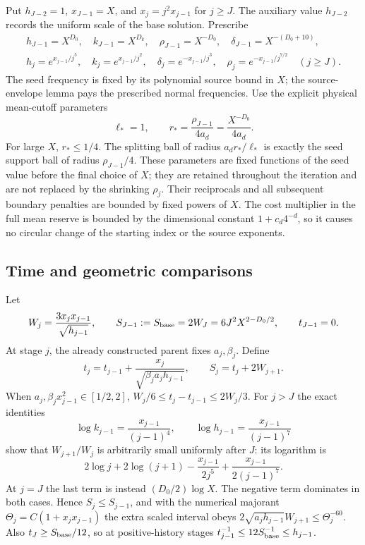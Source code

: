 Put $h_{J-2}=1$, $x_{J-1}=X$, and $x_j=j^2x_{j-1}$ for $j\geq J$.
The auxiliary value $h_{J-2}$ records the uniform scale of the base
solution. Prescribe
\begin{align}
 h_{J-1}=X^{D_0},\quad k_{J-1}=X^{D_k},\quad
 \rho_{J-1}=X^{-D_0},\quad \delta_{J-1}=X^{-(D_0+10)},
 \label{eq:seed-scales}\\
 h_j=e^{x_{j-1}/j^5},\quad k_j=e^{x_{j-1}/j^2},\quad
 \delta_j=e^{-x_{j-1}/j^3},\quad
 \rho_j=e^{-x_{j-1}/j^{7/2}}\quad(j\geq J).
 \label{eq:normal-scales}
\end{align}
The seed frequency is fixed by its polynomial source bound in $X$;
the source-envelope lemma pays the prescribed normal frequencies.
Use the explicit physical mean-cutoff parameters
\[
 \ell_*=1,\qquad r_*=\frac{\rho_{J-1}}{4a_d}
                   =\frac{X^{-D_0}}{4a_d}.
\]
For large $X$, $r_*\le1/4$. The splitting ball of radius
$a_dr_*/\ell_*$ is exactly the seed support ball of radius
$\rho_{J-1}/4$. These parameters are fixed functions of the seed value
before the final choice of $X$; they are retained throughout the
iteration and are not replaced by the shrinking $\rho_j$.
Their reciprocals and all subsequent boundary penalties are bounded by
fixed powers of $X$. The cost multiplier in the full mean reserve is
bounded by the dimensional constant $1+c_d4^{-d}$, so it causes no
circular change of the starting index or the source exponents.

\subsection{Time and geometric comparisons}
Let
\[
 W_j=\frac{3x_jx_{j-1}}{\sqrt{h_{j-1}}},\qquad
 S_{J-1}:=S_{\rm base}=2W_J=6J^2X^{2-D_0/2},\qquad t_{J-1}=0.
\]
At stage $j$, the already constructed parent fixes $a_j,\beta_j$.
Define
\begin{equation}\label{eq:actual-times}
 t_j=t_{j-1}+\frac{x_j}{\sqrt{\beta_ja_jh_{j-1}}},
 \qquad S_j=t_j+2W_{j+1}.
\end{equation}
When $a_j,\beta_jx_{j-1}^2\in[1/2,2]$,
$W_j/6\leq t_j-t_{j-1}\leq2W_j/3$.
For $j>J$ the exact identities
\[
 \log k_{j-1}=\frac{x_{j-1}}{(j-1)^4},\qquad
 \log h_{j-1}=\frac{x_{j-1}}{(j-1)^7}
\]
show that $W_{j+1}/W_j$ is arbitrarily small uniformly after $J$:
its logarithm is
\[
 2\log j+2\log(j+1)-\frac{x_{j-1}}{2j^5}
                    +\frac{x_{j-1}}{2(j-1)^7}.
\]
At $j=J$ the last term is instead $(D_0/2)\log X$.
The negative term dominates in both cases. Hence $S_j\leq S_{j-1}$,
and with the numerical majorant $\Theta_j=C(1+x_jx_{j-1})$ the extra scaled interval obeys
$2\sqrt{a_jh_{j-1}}W_{j+1}\leq\Theta_j^{-60}$.
Also $t_J\geq S_{\rm base}/12$, so at positive-history stages
$t_{j-1}^{-1}\leq12S_{\rm base}^{-1}\leq h_{j-1}$.

